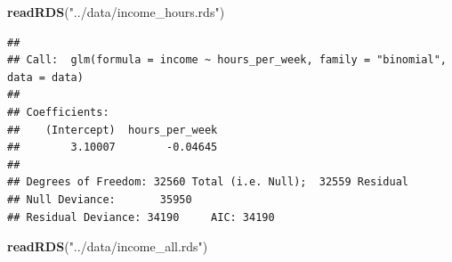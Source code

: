 \documentclass[]{article}
\newenvironment{Shaded}{\begin{snugshade}}{\end{snugshade}}
\newcommand{\KeywordTok}[1]{\textcolor[rgb]{0.13,0.29,0.53}{\textbf{#1}}}
\newcommand{\NormalTok}[1]{#1}
\newcommand{\StringTok}[1]{\textcolor[rgb]{0.31,0.60,0.02}{#1}}
\begin{document}
\begin{Shaded}
\begin{Highlighting}[]
\KeywordTok{readRDS}\NormalTok{(}\StringTok{"../data/income\_hours.rds"}\NormalTok{)}
\end{Highlighting}
\end{Shaded}

\begin{verbatim}
## 
## Call:  glm(formula = income ~ hours_per_week, family = "binomial", data = data)
## 
## Coefficients:
##    (Intercept)  hours_per_week  
##        3.10007        -0.04645  
## 
## Degrees of Freedom: 32560 Total (i.e. Null);  32559 Residual
## Null Deviance:       35950 
## Residual Deviance: 34190     AIC: 34190
\end{verbatim}

\begin{Shaded}
\begin{Highlighting}[]
\KeywordTok{readRDS}\NormalTok{(}\StringTok{"../data/income\_all.rds"}\NormalTok{)}
\end{Highlighting}
\end{Shaded}
\end{document}
